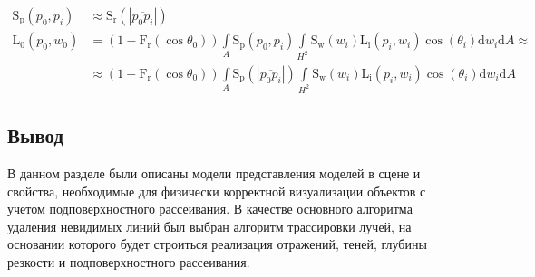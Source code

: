 \begin{align}
    \mathrm{S_p}(p_0, p_i) & \approx \mathrm{S_r}(|\overline{p_0 p_i}|) \\
    \mathrm{L_0}(p_0, w_0) & = (1 - \mathrm{F_r}(\cos\theta_0))
                               \int\limits_{A^{}} \mathrm{S_p}(p_0, p_i)
                               \int\limits_{{H^2}^{}} \mathrm{S_w}(w_i)
                               \mathrm{L_i}(p_i, w_i) \cos(\theta_i)
                               \mathrm{d} w_i \mathrm{d} A \approx \nonumber \\
                           & \approx (1 - \mathrm{F_r}(\cos\theta_0))
                             \int\limits_{A^{}}
                             \mathrm{S_p}(|\overline{p_0 p_i}|)
                             \int\limits_{{H^2}^{}} \mathrm{S_w}(w_i)
                             \mathrm{L_i}(p_i, w_i) \cos(\theta_i)
                             \mathrm{d} w_i \mathrm{d} A
\end{align}

\subsection*{Вывод}
В данном разделе были описаны модели представления моделей в сцене и
свойства, необходимые для физически корректной визуализации объектов с учетом
подповерхностного рассеивания. В качестве основного алгоритма удаления
невидимых линий был выбран алгоритм трассировки лучей, на основании которого
будет строиться реализация отражений, теней, глубины резкости и
подповерхностного рассеивания.

\pagebreak

